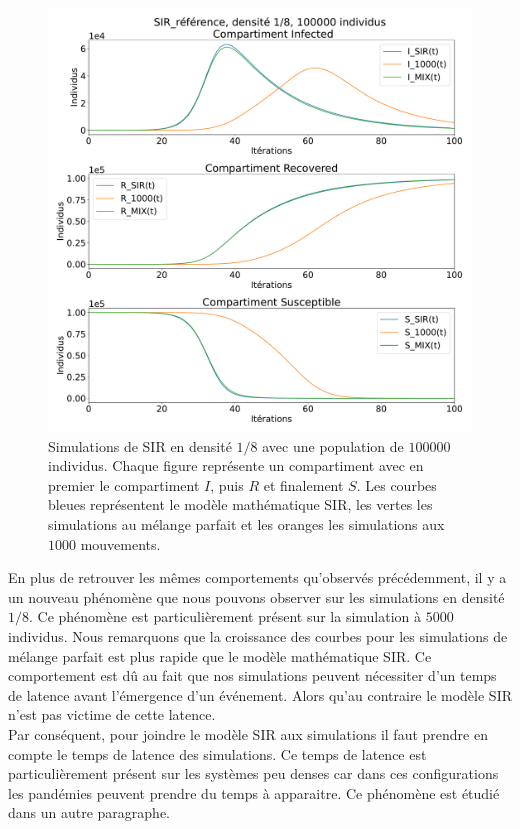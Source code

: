 \begin{figure}[h]
	\centering
	\captionsetup{justification=centering}
	\includegraphics[width=.8\textwidth]{Images/SIR_ref_8_100.pdf}
	\caption[Simulation SIR, densité $1/8$]{Simulations de SIR en densité $1/8$ avec une population de $100000$ individus. Chaque figure représente un compartiment avec en premier le compartiment $I$, puis $R$ et finalement $S$. Les courbes bleues représentent le modèle mathématique SIR, les vertes les simulations au mélange parfait et les oranges les simulations aux $1000$ mouvements.}
\end{figure}

En plus de retrouver les mêmes comportements qu'observés précédemment, il y a un nouveau phénomène que nous pouvons observer sur les simulations en densité $1/8$. Ce phénomène est particulièrement présent sur la simulation à $5000$ individus. Nous remarquons que la croissance des courbes pour les simulations de mélange parfait est plus rapide que le modèle mathématique SIR. Ce comportement est dû au fait que nos simulations peuvent nécessiter d'un temps de latence avant l'émergence d'un événement. Alors qu'au contraire le modèle SIR n'est pas victime de cette latence.\\

Par conséquent, pour joindre le modèle SIR aux simulations il faut prendre en compte le temps de latence des simulations. Ce temps de latence est particulièrement présent sur les systèmes peu denses car dans ces configurations les pandémies peuvent prendre du temps à apparaitre. Ce phénomène est étudié dans un autre paragraphe.

